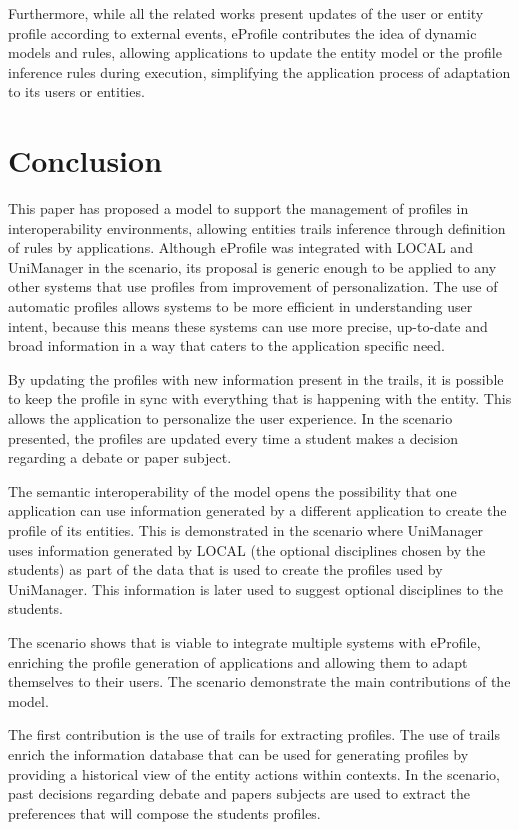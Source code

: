 \documentclass{svjour3}                     %
\begin{document}
Furthermore, while all the related works present updates of the user or entity profile according to external events, eProfile contributes the idea of dynamic models and rules, allowing applications to update the entity model or the profile inference rules during execution, simplifying the application process of adaptation to its users or entities.

\section{Conclusion}
\label{sec:conclusao}

This paper has proposed a model to support the management of profiles in interoperability environments, allowing entities trails inference through definition of rules by applications. Although eProfile was integrated with LOCAL and UniManager in the scenario, its proposal is generic enough to be applied to any other systems that use profiles from improvement of personalization. The use of automatic profiles allows systems to be more efficient in understanding user intent, because this means these systems can use more precise, up-to-date and broad information in a way that caters to the application specific need.

By updating the profiles with new information present in the trails, it is possible to keep the profile in sync with everything that is happening with the entity. This allows the application to personalize the user experience. In the scenario presented, the profiles are updated every time a student makes a decision regarding a debate or paper subject.

The semantic interoperability of the model opens the possibility that one application can use information generated by a different application to create the profile of its entities. This is demonstrated in the scenario where UniManager uses information generated by LOCAL (the optional disciplines chosen by the students) as part of the data that is used to create the profiles used by UniManager. This information is later used to suggest optional disciplines to the students.

The scenario shows that is viable to integrate multiple systems with eProfile, enriching the profile generation of applications and allowing them to adapt themselves to their users. The scenario demonstrate the main contributions of the model.

The first contribution is the use of trails for extracting profiles. The use of trails enrich the information database that can be used for generating profiles by providing a historical view of the entity actions within contexts. In the scenario, past decisions regarding debate and papers subjects are used to extract the preferences that will compose the students profiles.
\end{document}
